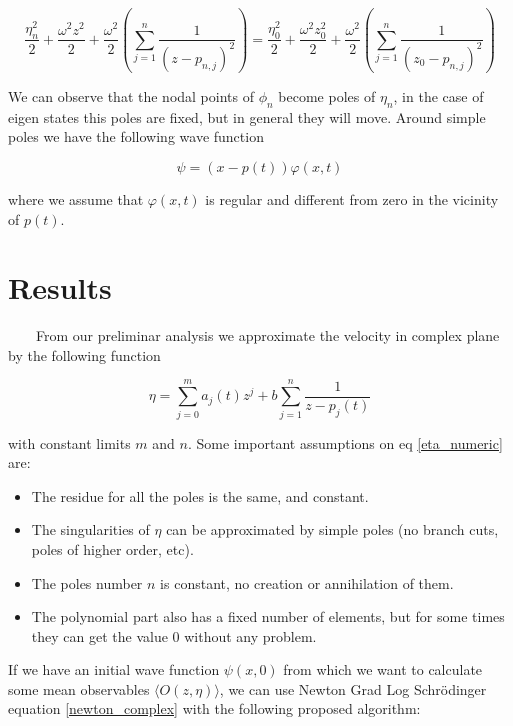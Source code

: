 \documentclass[a4paper,12pt]{article}
\begin{document}
\begin{equation}
\frac{\eta_n^2}{2} + \frac{\omega^2 z^2}{2} + \frac{\omega^2}{2}\left(\sum_{j=1}^{n} \frac{1}{ \left( z - p_{n,j} \right)^2} \right) = \frac{\eta_0^2}{2} + \frac{\omega^2 z_0^2}{2} + \frac{\omega^2}{2}\left(\sum_{j=1}^{n} \frac{1}{ \left( z_0 - p_{n,j} \right)^2} \right)
\end{equation}


We can observe that the nodal points of $\phi_n$ become poles of $\eta_n$, in the case of eigen states this poles are fixed, but in general they will move. Around simple poles we have the following wave function

\begin{equation}
\psi = (x-p(t))\varphi(x,t)
\end{equation}

where we assume that $\varphi(x,t)$ is regular and different from zero in the vicinity of $p(t)$.





\section{Results}

~~~~From our preliminar analysis we approximate the velocity in complex plane by the following function

\begin{equation}\label{eta_numeric}
\eta = \sum_{j=0}^{m} a_j(t) z^j + b \sum_{j=1}^{n} \frac{1}{z - p_j(t)}
\end{equation}

with constant limits $m$ and $n$. Some important assumptions on eq \ref{eta_numeric} are:

\begin{itemize}
\item The residue for all the poles is the same, and constant.
\item The singularities of $\eta$ can be approximated by simple poles (no branch cuts, poles of higher order, etc).
\item The poles number $n$ is constant, no creation or annihilation of them.
\item The polynomial part also has a fixed number of elements, but for some times they can get the value $0$ without any problem.
\end{itemize}


If we have an initial wave function $\psi(x,0)$ from which we want to calculate some mean observables $\langle O(z,\eta) \rangle$, we can 
 use Newton Grad Log Schr\"odinger equation \ref{newton_complex} with the following proposed algorithm:
\end{document}
